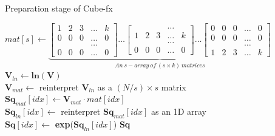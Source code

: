 \begin{algorithm}[tb]
    \caption{Preparation stage of Cube-fx}
    \setlength{\arraycolsep}{1.2pt}
    \label{alg:prepare}
        
    
    \BlankLine
    \BlankLine
    
    $mat[s] \leftarrow 
            \underbrace{            
                \begin{bmatrix} 1 & 2 & 3 & \dots & k   \\ 
                                0 & 0 & 0 & \dots & 0   \\
                                  &   &   & \dots &     \\ 
                                0 & 0 & 0 & \dots & 0 
                \end{bmatrix}
                \dots
                \begin{bmatrix}   &   &   & \dots &     \\ 
                                1 & 2 & 3 & \dots & k   \\ 
                                  &   &   & \dots &     \\ 
                                0 & 0 & 0 & \dots & 0 
                \end{bmatrix}
                \dots
                \begin{bmatrix} 0 & 0 & 0 & \dots & 0   \\ 
                                0 & 0 & 0 & \dots & 0   \\
                                  &   &   & \dots &     \\ 
                                1 & 2 & 3 & \dots & k
                \end{bmatrix}
            }_{An\ s-array\ of\ (s \times k)\ matrices}
    $ \\
    \BlankLine
    \BlankLine
    $\textbf{V}_{ln} \leftarrow \textbf{ln}(\textbf{V})$ \\
    $\textbf{V}_{mat} \leftarrow$ reinterpret $\textbf{V}_{ln}$ as a $(N / s) \times s$ matrix \\
     {
        $\textbf{Sq}_{mat}[idx] \leftarrow \textbf{V}_{mat} \cdot mat[idx]$ \\
        $\textbf{Sq}_{ln}[idx] \leftarrow$ reinterpret $\textbf{Sq}_{mat}[idx]$ as an 1D array \\
        $\textbf{Sq}[idx] \leftarrow $ \textbf{exp}($\textbf{Sq}_{ln}[idx]$)
    }
    \Return \textbf{Sq}
\end{algorithm}

